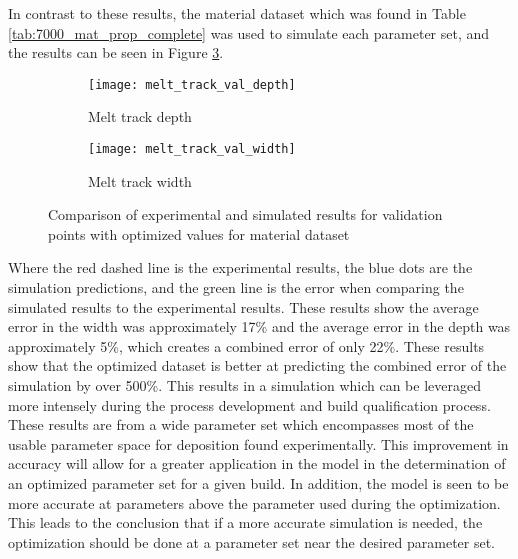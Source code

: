 In contrast to these results, the material dataset which was found in Table \ref{tab:7000_mat_prop_complete} was used to simulate each parameter set, and the results can be seen in Figure \ref{fig:melt_track_val}.
\begin{figure}[!htb]\centering
	\begin{subfigure}[c]{0.45\textwidth}\centering
	\texttt{[image: melt\_track\_val\_depth]}
	\caption{Melt track depth}
	\label{fig:melt_track_val_depth}
	\end{subfigure}\hfill{}
		\begin{subfigure}[c]{0.45\textwidth}\centering
		\texttt{[image: melt\_track\_val\_width]}
		\caption{Melt track width}
		\label{fig:melt_track_val_width}
		\end{subfigure}
	\caption{Comparison of experimental and simulated results for  validation points with optimized values for  material dataset}
	\label{fig:melt_track_val}
\end{figure}
Where the red dashed line is the experimental results, the blue dots are the simulation predictions, and the green line is the error when comparing the simulated results to the experimental results.
These results show the average error in the width was approximately 17\% and the average error in the depth was approximately 5\%, which creates a combined error of only 22\%.  These results show that the optimized dataset is better at predicting the combined error of the simulation by over 500\%.  This results in a simulation which can be leveraged more intensely during the process development and build qualification process.  
These results are from a wide parameter set which encompasses most of the usable parameter space for deposition found experimentally.  This improvement in accuracy will allow for a greater application in the model in the determination of an optimized parameter set for a given build.  In addition, the model is seen to be more accurate at parameters above the parameter used during the optimization.  This leads to the conclusion that if a more accurate simulation is needed, the optimization should be done at a parameter set near the desired parameter set.